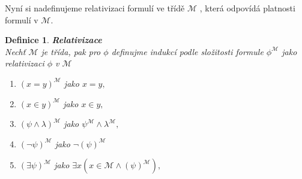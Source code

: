 \documentclass[12pt,a4paper]{article}
\newtheorem{definice}[veta]{Definice}
\begin{document}
\newpage
Nyn\'{i} si nadefinujeme relativizaci formul\'{i} ve t\v{r}\'{i}d\v{e} $ \mathcal{M} $ , kter\'{a} odpov\'{i}d\'{a} platnosti formul\'{i} v $ \mathcal{M} $.
\begin{definice}%
\textbf{Relativizace \\}
Nech\v{t} $ \mathcal{M} $ je t\v{r}\'{i}da, pak pro $ \phi $ definujme indukc\'{i} podle slo\v{z}itosti formule $ \phi^{ \mathcal{M}} $ jako relativizaci $ \phi $ v $ \mathcal{M} $\\
\begin{enumerate}
\item  $ (x=y)^{ \mathcal{M}}$ jako $ x=y,  $ 
\item $ (x \in y)^{ \mathcal{M}}$ jako $ x \in y, $
\item $ (\psi \wedge \lambda )^{ \mathcal{M}}$ jako  $\psi^{ \mathcal{M}}  \wedge  \lambda^{ \mathcal{M}}, $
\item $ (\neg \psi)^{ \mathcal{M}}$ jako $\neg (\psi)^{ \mathcal{M}}$
\item $(\exists \psi)^{ \mathcal{M}}$ jako $\exists x ( x \in \mathcal{M} \wedge (\psi)^{ \mathcal{M}}),$
\end{enumerate}
\label{def:relat}
\end{definice} 
\end{document}
